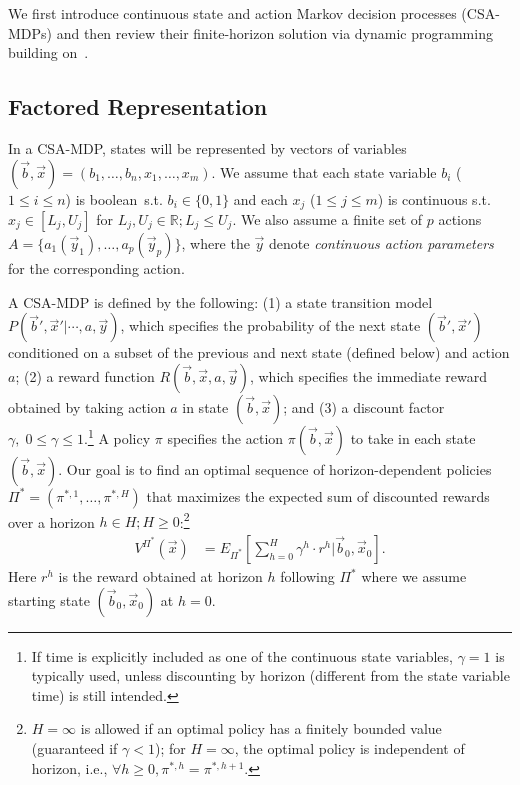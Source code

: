 \label{sec:csamdp}

We first introduce continuous state and action Markov decision
processes (CSA-MDPs) and then review their finite-horizon solution via
dynamic programming building on~\cite{sanner_uai11}.  

\subsection{Factored Representation}

In a CSA-MDP, states will be represented by vectors of variables
$(\vec{b},\vec{x}) = ( b_1,\ldots,b_n,x_{1},\ldots,x_m )$.  We assume
that each state variable $b_i$ ($1 \leq i \leq n$) is
boolean$\,$ s.t. $b_i \in \{ 0,1 \}$ and each $x_j$ ($1 \leq j \leq m$) is 
continuous s.t. $x_j \in [L_j,U_j]$ for $L_j,U_j \in
\mathbb{R}; L_j \leq U_j$.  We also assume a finite set of $p$ actions $A
= \{ a_1(\vec{y}_1), \ldots, a_p(\vec{y}_p) \}$, where the $\vec{y}$ denote
\emph{continuous action parameters} for the corresponding action.

A CSA-MDP is defined by the following: (1) a state transition model
$P(\vec{b}',\vec{x}'|\cdots,a,\vec{y})$, which specifies the probability of
the next state $(\vec{b}',\vec{x}')$ conditioned on a subset of the
previous and next state (defined below) and action $a$; (2) a reward
function $R(\vec{b},\vec{x},a,\vec{y})$, which specifies the immediate reward
obtained by taking action $a$ in state $(\vec{b},\vec{x})$; and (3) a
discount factor $\gamma, \; 0 \leq \gamma \leq 1$.\footnote{If time is
explicitly included as one of the continuous state variables, $\gamma
= 1$ is typically used, unless discounting by horizon (different from
the state variable time) is still intended.}  
A policy $\pi$
specifies the action $\pi(\vec{b},\vec{x})$ to take in each state
$(\vec{b},\vec{x})$.  Our goal is to find an optimal sequence of
horizon-dependent policies $\Pi^* = (\pi^{*,1},\ldots,\pi^{*,H})$
that maximizes the expected sum of discounted rewards over a horizon
$h \in H; H \geq 0$:\footnote{$H=\infty$ is allowed if an optimal policy has a
finitely bounded value (guaranteed if $\gamma < 1$); for $H=\infty$, 
the optimal policy is independent of horizon, 
i.e., $\forall h \geq 0, \pi^{*,h} = \pi^{*,h+1}$.}
\begin{align}
V^{\Pi^*}(\vec{x}) & = E_{\Pi^*} \left[ \sum_{h=0}^{H} \gamma^h \cdot r^h \Big| \vec{b}_0,\vec{x}_0 \right]. \label{eq:vfun_def}
\end{align}
Here $r^h$ is the reward obtained at horizon $h$ following $\Pi^*$ where 
we assume starting state $(\vec{b}_0,\vec{x}_0)$ at $h=0$.
 
